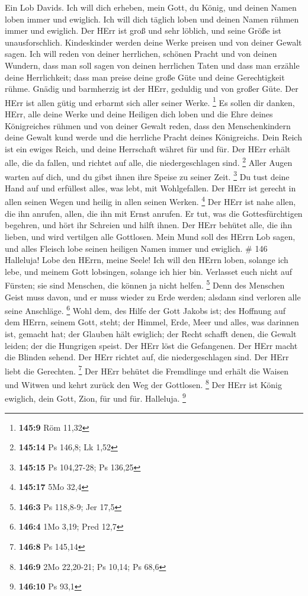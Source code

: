  Ein Lob Davids. Ich will dich erheben, mein Gott, du König,
und deinen Namen loben immer und ewiglich.  Ich will dich
täglich loben und deinen Namen rühmen immer und ewiglich. 
Der HErr ist groß und sehr löblich, und seine Größe ist unausforschlich.
 Kindeskinder werden deine Werke preisen und von deiner
Gewalt sagen.  Ich will reden von deiner herrlichen, schönen
Pracht und von deinen Wundern,  dass man soll sagen von
deinen herrlichen Taten und dass man erzähle deine Herrlichkeit;
 dass man preise deine große Güte und deine Gerechtigkeit
rühme.  Gnädig und barmherzig ist der HErr, geduldig und von
großer Güte.  Der HErr ist allen gütig und erbarmt sich
aller seiner Werke. \footnote{\textbf{145:9} Röm 11,32}  Es
sollen dir danken, HErr, alle deine Werke und deine Heiligen dich loben
 und die Ehre deines Königreiches rühmen und von deiner
Gewalt reden,  dass den Menschenkindern deine Gewalt kund
werde und die herrliche Pracht deines Königreichs.  Dein
Reich ist ein ewiges Reich, und deine Herrschaft währet für und für.
 Der HErr erhält alle, die da fallen, und richtet auf alle,
die niedergeschlagen sind. \footnote{\textbf{145:14} Ps 146,8; Lk 1,52}
 Aller Augen warten auf dich, und du gibst ihnen ihre
Speise zu seiner Zeit. \footnote{\textbf{145:15} Ps 104,27-28; Ps 136,25}
 Du tust deine Hand auf und erfüllest alles, was lebt, mit
Wohlgefallen.  Der HErr ist gerecht in allen seinen Wegen
und heilig in allen seinen Werken. \footnote{\textbf{145:17} 5Mo 32,4}
 Der HErr ist nahe allen, die ihn anrufen, allen, die ihn
mit Ernst anrufen.  Er tut, was die Gottesfürchtigen
begehren, und hört ihr Schreien und hilft ihnen.  Der HErr
behütet alle, die ihn lieben, und wird vertilgen alle Gottlosen.
 Mein Mund soll des HErrn Lob sagen, und alles Fleisch lobe
seinen heiligen Namen immer und ewiglich. \# 146  Halleluja!
Lobe den HErrn, meine Seele!  Ich will den HErrn loben,
solange ich lebe, und meinem Gott lobsingen, solange ich hier bin.
 Verlasset euch nicht auf Fürsten; sie sind Menschen, die
können ja nicht helfen. \footnote{\textbf{146:3} Ps 118,8-9; Jer 17,5}
 Denn des Menschen Geist muss davon, und er muss wieder zu
Erde werden; alsdann sind verloren alle seine Anschläge. \footnote{\textbf{146:4}
  1Mo 3,19; Pred 12,7}  Wohl dem, des Hilfe der Gott Jakobs
ist; des Hoffnung auf dem HErrn, seinem Gott, steht;  der
Himmel, Erde, Meer und alles, was darinnen ist, gemacht hat; der Glauben
hält ewiglich;  der Recht schafft denen, die Gewalt leiden;
der die Hungrigen speist. Der HErr löst die Gefangenen.  Der
HErr macht die Blinden sehend. Der HErr richtet auf, die
niedergeschlagen sind. Der HErr liebt die Gerechten. \footnote{\textbf{146:8}
  Ps 145,14}  Der HErr behütet die Fremdlinge und erhält die
Waisen und Witwen und kehrt zurück den Weg der Gottlosen. \footnote{\textbf{146:9}
  2Mo 22,20-21; Ps 10,14; Ps 68,6}  Der HErr ist König
ewiglich, dein Gott, Zion, für und für. Halleluja. \footnote{\textbf{146:10}
  Ps 93,1}

